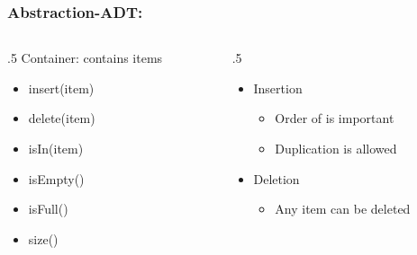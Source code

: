 \documentclass{beamer}
\begin{document}
\begin{frame}\frametitle{Abstraction-ADT: }
	\begin{columns}[T] %
	\begin{column}{.5\linewidth} %
	    	Container: contains items
		\begin{itemize}
			\item insert(item)
			\item delete(item)
			\item isIn(item)
			\item isEmpty()
			\item isFull()
			\item size()			
		\end{itemize}
	\end{column} %
	\begin{column}{.5\linewidth} %
		\begin{itemize}

			\item
			Insertion
			\begin{itemize}
				\item
				Order of is  important
	
				\item
				Duplication is   allowed
			\end{itemize}

			\item
			Deletion
			\begin{itemize}
				\item
				Any item can be deleted
			\end{itemize}
		\end{itemize}
	\end{column} %
	\end{columns} %
\end{frame}




\end{document}

